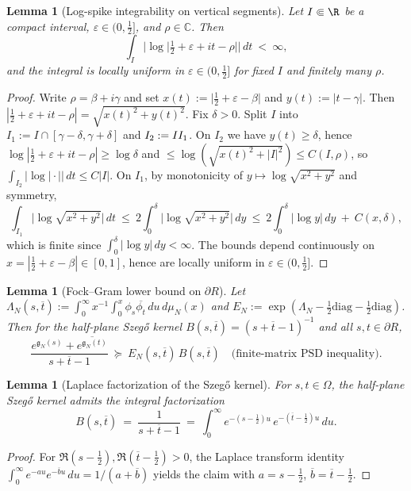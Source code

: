 \documentclass[11pt]{article}
\newtheorem{lemma}[theorem]{Lemma}
\theoremstyle{remark}
\newcommand{\C}{\mathbb{C}}
\begin{document}
\begin{lemma}[Log-spike integrability on vertical segments]\label{lem:log-spike-int}
Let $I\Subset\R$ be a compact interval, $\varepsilon\in(0,\tfrac12]$, and $\rho\in\C$. Then
\[
 \int_I \big|\log\big|\tfrac12+\varepsilon+it-\rho\big|\big|\,dt\ <\ \infty,
\]
and the integral is locally uniform in $\varepsilon\in(0,\tfrac12]$ for fixed $I$ and finitely many $\rho$.
\end{lemma}
\begin{proof}
Write $\rho=\beta+i\gamma$ and set $x(t):=\big|\tfrac12+\varepsilon-\beta\big|$ and $y(t):=|t-\gamma|$. Then $|\tfrac12+\varepsilon+it-\rho|=\sqrt{x(t)^2+y(t)^2}$. Fix $\delta>0$. Split $I$ into $I_1:=I\cap[\gamma-\delta,\gamma+\delta]$ and $I_2:=I\\I_1$. On $I_2$ we have $y(t)\ge \delta$, hence $\log|\tfrac12+\varepsilon+it-\rho|\ge \log\delta$ and $\le \log(\sqrt{x(t)^2+|I|^2})\le C(I,\rho)$, so $\int_{I_2}|\log|\cdot||\,dt\le C|I|$. On $I_1$, by monotonicity of $y\mapsto \log\sqrt{x^2+y^2}$ and symmetry,
\[
 \int_{I_1}\!\big|\log\sqrt{x^2+y^2}\big|\,dt\ \le\ 2\int_0^{\delta} \big|\log\sqrt{x^2+y^2}\big|\,dy\ \le\ 2\int_0^{\delta} \big|\log y\big|\,dy\ +\ C(x,\delta),
\]
which is finite since $\int_0^{\delta}|\log y|\,dy<\infty$. The bounds depend continuously on $x=|\tfrac12+\varepsilon-\beta|\in[0,1]$, hence are locally uniform in $\varepsilon\in(0,\tfrac12]$.
\end{proof}

\begin{lemma}[Fock–Gram lower bound on \(\partial R\)]\label{lem:fock-gram-formal}
Let \(\Lambda_N(s,\overline t):=\int_0^\infty x^{-1}\int_0^x \phi_s\overline{\phi_t}\,du\,d\mu_N(x)\) and \(E_N:=\exp(\Lambda_N-\tfrac12\mathrm{diag}-\tfrac12\mathrm{diag})\). Then for the half-plane Szeg\H{o} kernel \(B(s,\overline t)=(s+\overline t-1)^{-1}\) and all \(s,t\in\partial R\),
\[\frac{e^{\mathfrak g_N(s)}+\overline{e^{\mathfrak g_N(t)}}}{s+\overline t-1}\ \succeq\ E_N(s,\overline t)\,B(s,\overline t)\quad\text{(finite-matrix PSD inequality).}\]
\end{lemma}

\begin{lemma}[Laplace factorization of the Szeg\H{o} kernel]\label{lem:laplace-szego}
For \(s,t\in\Omega\), the half-plane Szeg\H{o} kernel admits the integral factorization
\[
 B(s,\overline t)\ =\ \frac{1}{s+\overline t-1}\ =\ \int_{0}^{\infty} e^{-(s-\tfrac12)u}\,e^{-(\overline t-\tfrac12)u}\,du.
\]
\end{lemma}
\begin{proof}
For \(\Re(s-\tfrac12),\Re(\overline t-\tfrac12)>0\), the Laplace transform identity \(\int_0^\infty e^{-au}e^{-\overline bu}\,du=1/(a+\overline b)\) yields the claim with \(a=s-\tfrac12\), \(\overline b=\overline t-\tfrac12\).
\end{proof}
\end{document}
